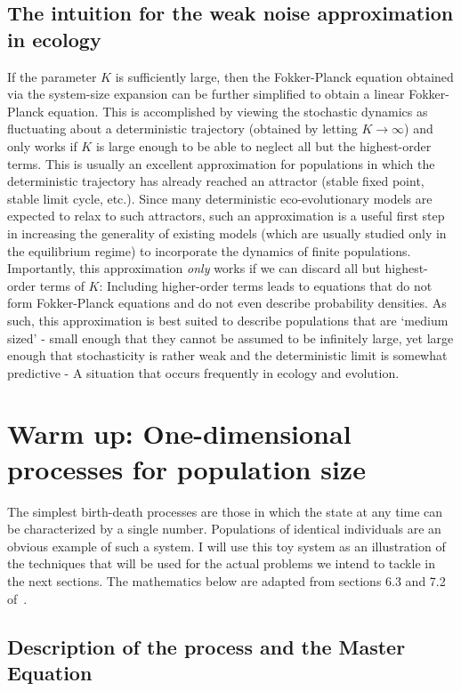 \subsection{The intuition for the weak noise approximation in ecology}
If the parameter $K$ is sufficiently large, then the Fokker-Planck equation obtained via the system-size expansion can be further simplified to obtain a linear Fokker-Planck equation. This is accomplished by viewing the stochastic dynamics as fluctuating about a deterministic trajectory (obtained by letting $K \to \infty$) and only works if $K$ is large enough to be able to neglect all but the highest-order terms. This is usually an excellent approximation for populations in which the deterministic trajectory has already reached an attractor (stable fixed point, stable limit cycle, etc.). Since many deterministic eco-evolutionary models are expected to relax to such attractors, such an approximation is a useful first step in increasing the generality of existing models (which are usually studied only in the equilibrium regime) to incorporate the dynamics of finite populations. Importantly, this approximation \emph{only} works if we can discard all but highest-order terms of $K$: Including higher-order terms leads to equations that do not form Fokker-Planck equations and do not even describe probability densities. As such, this approximation is best suited to describe populations that are `medium sized' - small enough that they cannot be assumed to be infinitely large, yet large enough that stochasticity is rather weak and the deterministic limit is somewhat predictive - A situation that occurs frequently in ecology and evolution.

\section{Warm up: One-dimensional processes for population size}\label{sec_1D_processes}
The simplest birth-death processes are those in which the state at any time can be characterized by a single number. Populations of identical individuals are an obvious example of such a system. I will use this toy system as an illustration of the techniques that will be used for the actual problems we intend to tackle in the next sections. The mathematics below are adapted from sections 6.3 and 7.2 of~\citep{gardiner_stochastic_2009}.

\subsection{Description of the process and the Master Equation}

